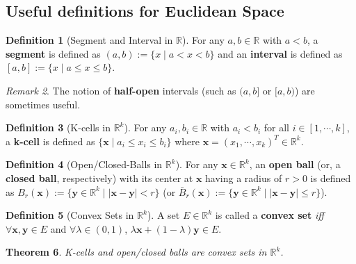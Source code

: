 \documentclass[a4paper,12pt]{report}
\newcommand{\R}{\mathbb{R}}
\newcommand{\tb}{\textbf}
\theoremstyle{plain}
\newtheorem{theorem}{\color{blue}Theorem}[chapter] %
\theoremstyle{definition}
\newtheorem{definition}[theorem]{\color{red}Definition} %
\theoremstyle{remark}
\newtheorem{remark}[theorem]{\color{ForestGreen}Remark} %
\begin{document}
\subsection{Useful definitions for Euclidean Space}
\begin{definition}[Segment and Interval in $\R$]
For any $a,b\in\R$ with $a<b$, a \tb{segment} is defined as $(a,b):=\{x\mid a<x<b\}$ and an \tb{interval} is defined as $[a,b]:=\{x\mid a\le x\le b\}$.
\end{definition}
\begin{remark}
The notion of \tb{half-open} intervals (such as $(a,b]$ or $[a,b)$) are sometimes useful.
\end{remark}
\begin{definition}[K-cells in $\R^k$]
For any $a_i,b_i\in\R$ with $a_i<b_i$ for all $i\in[1,\cdots,k]$, a \tb{k-cell} is defined as $\{\mathbf{x}\mid a_i\le x_i\le b_i\}$ where $\mathbf{x}=(x_1,\cdots,x_k)^T\in\R^k$.
\end{definition}
\begin{definition}[Open/Closed-Balls in $\R^k$]
For any $\mathbf{x}\in\R^k$, an \tb{open ball} (or, a \tb{closed ball}, respectively) with its center at $\mathbf{x}$ having a radius of $r>0$ is defined as $B_r(\mathbf{x}):=\{\mathbf{y}\in\R^k\mid |\mathbf{x}-\mathbf{y}|<r\}$ (or $\bar{B}_r(\mathbf{x}):=\{\mathbf{y}\in\R^k\mid |\mathbf{x}-\mathbf{y}|\le r\}$).
\end{definition}
\begin{definition}[Convex Sets in $\R^k$]
A set $E\in\R^k$ is called a \tb{convex set} \emph{iff} $\forall \mathbf{x},\mathbf{y}\in E$ and $\forall\lambda\in(0,1)$, $\lambda\mathbf{x}+(1-\lambda)\mathbf{y}\in E$.
\end{definition}
\begin{theorem}
K-cells and open/closed balls are convex sets in $\R^k$.
\end{theorem}
\end{document}
